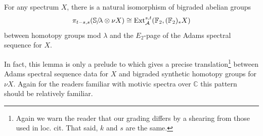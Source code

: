 \begin{lem} \label{lem:ctau-E2}
  For any spectrum $X$, there is a natural isomorphism of bigraded abelian groups
  \[ \pi_{t-s,s}(\operatorname{\mathbb{S}}\hspace{-2.2pt}/\!\lambda \otimes \nu X) \cong \operatorname{\mathrm{Ext}}_{\operatorname{\mathcal{A}}}^{s,t}(\operatorname{\mathbb{F}}_2,(\operatorname{\mathbb{F}}_2)_*X) \]
  between homotopy groups mod $\lambda$ and the $E_2$-page of the Adams spectral sequence for $X$.
\end{lem}


In fact, this lemma is only a prelude to \cite[Theorem 9.19]{boundaries} which gives a precise translation\footnote{Again we warn the reader that our grading differs by a shearing from those used in loc. cit. That said, $k$ and $s$ are the same.} between Adams spectral sequence data for $X$ and bigraded synthetic homotopy groups for $\nu X$. Again for the readers familiar with motivic spectra over $\mathbb{C}$ this pattern should be relatively familiar.



